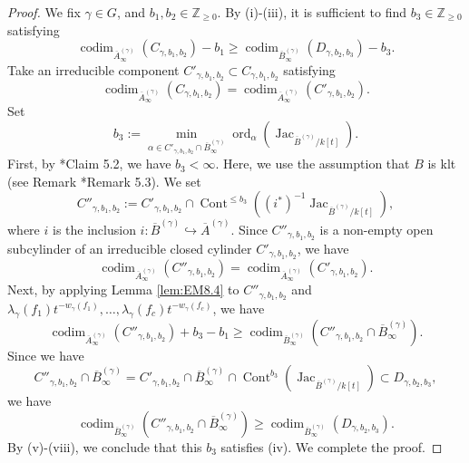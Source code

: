 \documentclass[a4paper,11pt]{amsart}
\theoremstyle{definition}
\theoremstyle{remark}
\begin{document}
\begin{proof}
We fix $\gamma \in G$, and $b_1, b_2 \in \mathbb{Z}_{\ge 0}$. 
By (i)-(iii), it is sufficient to find $b_3 \in \mathbb{Z}_{\ge 0}$ satisfying
\[\tag{iv}
\operatorname{codim}_{\overline{A}^{(\gamma)}_\infty} \left( C_{\gamma, b_1, b_2} \right) - b_1
\ge
\operatorname{codim}_{\overline{B}^{(\gamma)}_\infty} \left( D_{\gamma, b_2, b_3} \right) - b_3. 
\]
Take an irreducible component $C'_{\gamma, b_1, b_2} \subset C_{\gamma, b_1, b_2}$ satisfying 
\[\tag{v}
\operatorname{codim}_{\overline{A}^{(\gamma)}_\infty} \left( C_{\gamma, b_1, b_2} \right ) = \operatorname{codim}_{\overline{A}^{(\gamma)}_\infty} \left( C' _{\gamma, b_1, b_2} \right). 
\]
Set 
\[
b_3 := \min _{\alpha \in C'_{\gamma, b_1, b_2} \cap \overline{B}^{(\gamma)}_{\infty}} \operatorname{ord}_{\alpha} \left( \operatorname{Jac}_{\overline{B}^{(\gamma)}/k[t]} \right). 
\]
First, by \cite{NS22}*{Claim 5.2}, we have $b_3 < \infty$. 
Here, we use the assumption that $B$ is klt (see Remark \cite{NS22}*{Remark 5.3}). 
We set 
\[
C''_{\gamma, b_1, b_2} := C'_{\gamma, b_1, b_2} \cap \operatorname{Cont}^{\le b_3} 
\left( (i^*) ^{-1} \operatorname{Jac}_{\overline{B}^{(\gamma)}/k[t]} \right), 
\]
where $i$ is the inclusion $i : \overline{B}^{(\gamma)} \hookrightarrow \overline{A}^{(\gamma)}$. 
Since $C''_{\gamma, b_1, b_2}$ is a non-empty open subcylinder of an irreducible closed cylinder $C'_{\gamma , b_1, b_2}$, 
we have 
\[\tag{vi}
\operatorname{codim}_{\overline{A}^{(\gamma)}_\infty} \left( C'' _{\gamma, b_1, b_2} \right)
= 
\operatorname{codim}_{\overline{A}^{(\gamma)}_\infty} \left( C' _{\gamma, b_1, b_2} \right). 
\]
Next, by applying Lemma \ref{lem:EM8.4} to $C''_{\gamma, b_1, b_2}$ and $\lambda _{\gamma}(f_1)t^{-w_\gamma(f_1)}, \ldots, \lambda _{\gamma}(f_c)t^{-w_\gamma(f_c)}$, we have 
\[\tag{vii}
\operatorname{codim}_{\overline{A}^{(\gamma)}_\infty} 
\left( 
C''_{\gamma, b_1, b_2}
\right) 
+ b_3 - b_1
\ge
\operatorname{codim}_{\overline{B}^{(\gamma)}_{\infty}} \left(
C''_{\gamma, b_1, b_2} \cap \overline{B}^{(\gamma)}_{\infty}
\right).
\]
Since we have 
\[
C''_{\gamma, b_1, b_2} \cap \overline{B}^{(\gamma)}_{\infty}
= C'_{\gamma, b_1, b_2} \cap \overline{B}^{(\gamma)}_{\infty} \cap 
\operatorname{Cont}^{b_3} 
\left( \operatorname{Jac}_{\overline{B}^{(\gamma)}/k[t]} \right)
\subset D_{\gamma, b_2, b_3}, 
\]
we have 
\[\tag{viii}
\operatorname{codim}_{\overline{B}^{(\gamma)}_{\infty}} \left(
C''_{\gamma, b_1, b_2} \cap \overline{B}^{(\gamma)}_{\infty}
\right)
\ge 
\operatorname{codim}_{\overline{B}^{(\gamma)}_{\infty}} 
\left( D_{\gamma, b_2, b_3} \right). 
\]
By (v)-(viii), we conclude that this $b_3$ satisfies (iv). We complete the proof. 
\end{proof}
\end{document}
